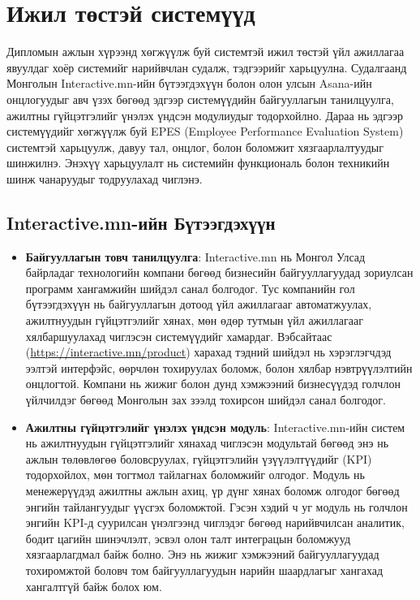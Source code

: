\newpage
\section{Ижил төстэй системүүд}
Дипломын ажлын хүрээнд хөгжүүлж буй системтэй ижил төстэй үйл ажиллагаа явуулдаг 
хоёр системийг нарийвчлан судалж, тэдгээрийг харьцуулна. Судалгаанд Монголын 
Interactive.mn-ийн бүтээгдэхүүн болон олон улсын Asana-ийн онцлогуудыг авч үзэх 
бөгөөд эдгээр системүүдийн байгууллагын танилцуулга, ажилтны гүйцэтгэлийг үнэлэх
үндсэн модулиудыг тодорхойлно. Дараа нь эдгээр системүүдийг хөгжүүлж буй EPES 
(Employee Performance Evaluation System) системтэй харьцуулж, давуу тал, онцлог, 
болон боломжит хязгаарлалтуудыг шинжилнэ. Энэхүү харьцуулалт нь системийн функциональ
 болон техникийн шинж чанаруудыг тодруулахад чиглэнэ.

\subsection{Interactive.mn-ийн Бүтээгдэхүүн}
\begin{itemize}
    \item \textbf{Байгууллагын товч танилцуулга}: Interactive.mn нь Монгол Улсад байрладаг технологийн 
    компани бөгөөд бизнесийн байгууллагуудад зориулсан программ хангамжийн шийдэл санал болгодог. Тус 
    компанийн гол бүтээгдэхүүн нь байгууллагын дотоод үйл ажиллагааг автоматжуулах, ажилтнуудын 
    гүйцэтгэлийг хянах, мөн өдөр тутмын үйл ажиллагааг хялбаршуулахад чиглэсэн системүүдийг хамардаг. 
    Вэбсайтаас (\url{https://interactive.mn/product}) харахад тэдний шийдэл нь хэрэглэгчдэд ээлтэй 
    интерфэйс, өөрчлөн тохируулах боломж, болон хялбар нэвтрүүлэлтийн онцлогтой. Компани нь жижиг 
    болон дунд хэмжээний бизнесүүдэд голчлон үйлчилдэг бөгөөд Монголын зах зээлд тохирсон шийдэл 
    санал болгодог.
    \item \textbf{Ажилтны гүйцэтгэлийг үнэлэх үндсэн модуль}: Interactive.mn-ийн систем нь ажилтнуудын 
    гүйцэтгэлийг хянахад чиглэсэн модультай бөгөөд энэ нь ажлын төлөвлөгөө боловсруулах, гүйцэтгэлийн 
    үзүүлэлтүүдийг (KPI) тодорхойлох, мөн тогтмол тайлагнах боломжийг олгодог. Модуль нь менежерүүдэд 
    ажилтны ажлын ахиц, үр дүнг хянах боломж олгодог бөгөөд энгийн тайлангуудыг үүсгэх боломжтой. 
    Гэсэн хэдий ч уг модуль нь голчлон энгийн KPI-д суурилсан үнэлгээнд чиглэдэг бөгөөд нарийвчилсан 
    аналитик, бодит цагийн шинэчлэлт, эсвэл олон талт интеграцын боломжууд хязгаарлагдмал байж болно. 
    Энэ нь жижиг хэмжээний байгууллагуудад тохиромжтой боловч том байгууллагуудын нарийн шаардлагыг 
    хангахад хангалтгүй байж болох юм.
\end{itemize}

